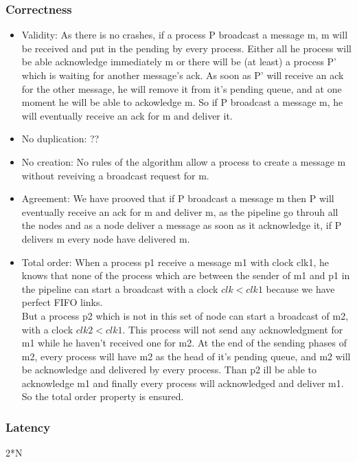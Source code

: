\documentclass[a4paper]{article}
\begin{document}
\subsubsection{Correctness}
\begin{itemize}
    \item Validity: As there  is no crashes, if a process P broadcast a
        message m, m will be received and put in the pending by every
        process. Either all he process will be able acknowledge immediately m 
        or there will be (at least) a process P' which is waiting for another message's ack.
        As soon as P' will receive an ack for the other message, he will remove it from it's
        pending queue, and at one moment he will be able to ackowledge m. 
        So if P broadcast a message m, he will eventually receive an ack
        for m and deliver it.
    \item No duplication: ?? %
    \item No creation: No rules of the algorithm allow a process to
        create a message m without reveiving a broadcast request for m.
    \item Agreement: We have prooved that if P broadcast a message m
        then P will eventually receive an ack for m and deliver m, as
        the pipeline go throuh all the nodes and as a node deliver a
        message as soon as it acknowledge it, if P delivers m every node
        have delivered m.
    \item Total order: When a process p1 receive a message m1 with
        clock clk1, he knows
        that none of the process which are between the sender of m1 and p1
        in the pipeline can start a broadcast with a clock $clk<clk1$
        because we have perfect FIFO links.\\
        But a process p2 which is not in this set of node can start a
        broadcast of m2, with a clock $clk2<clk1$. This process will not send
        any acknowledgment for m1 while he haven't received one for m2.
        At the end of the sending phases of m2, every process will have
        m2 as the head of it's pending queue, and m2 will be acknowledge
        and delivered by every process. Than p2 ill be able to
        acknowledge m1 and finally every process will acknowledged and
        deliver m1. So the total order property is ensured.
\end{itemize}
\label{sec:pipelineack-proof}


\subsubsection*{Latency}
2*N
\end{document}
